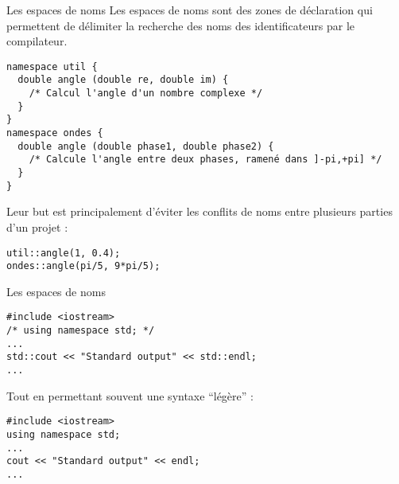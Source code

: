 \documentclass[c]{beamer}
\begin{document}

\begin{frame}[fragile]{Les espaces de noms}
Les espaces de noms sont des zones de déclaration qui permettent de délimiter la recherche des noms des identificateurs par le compilateur.

\begin{verbatim}
namespace util {
  double angle (double re, double im) {
    /* Calcul l'angle d'un nombre complexe */
  }
}
namespace ondes {
  double angle (double phase1, double phase2) {
    /* Calcule l'angle entre deux phases, ramené dans ]-pi,+pi] */
  }
}
\end{verbatim}

Leur but est principalement d'éviter les conflits de noms entre plusieurs
parties d'un projet :

\begin{verbatim}
util::angle(1, 0.4);
ondes::angle(pi/5, 9*pi/5);
\end{verbatim}

\end{frame}

\begin{frame}[fragile]{Les espaces de noms}


\begin{verbatim}
#include <iostream>
/* using namespace std; */
...
std::cout << "Standard output" << std::endl;
...
\end{verbatim}

\vspace{1em}
Tout en permettant souvent une syntaxe ``légère'' :
\vspace{1em}

\begin{verbatim}
#include <iostream>
using namespace std;
...
cout << "Standard output" << endl;
...
\end{verbatim}

\end{frame}

\end{document}
